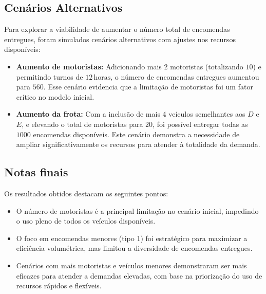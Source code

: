 \subsection{Cenários Alternativos}\label{subsec:cenarios-alternativos}
Para explorar a viabilidade de aumentar o número total de encomendas entregues, foram simulados cenários alternativos com ajustes nos recursos disponíveis:
\begin{itemize}
    \item \textbf{Aumento de motoristas:} Adicionando mais 2 motoristas (totalizando \(10\)) e permitindo turnos de \(12 \, \mathrm{horas}\), o número de encomendas entregues aumentou para \(560\).
    Esse cenário evidencia que a limitação de motoristas foi um fator crítico no modelo inicial.
    \item \textbf{Aumento da frota:} Com a inclusão de mais 4 veículos semelhantes aos \(D\) e \(E\), e elevando o total de motoristas para \(20\), foi possível entregar todas as \(1000\) encomendas disponíveis.
    Este cenário demonstra a necessidade de ampliar significativamente os recursos para atender à totalidade da demanda.
\end{itemize}

\subsection{Notas finais}\label{subsec:conclusoes-dos-resultados}
Os resultados obtidos destacam os seguintes pontos:
\begin{itemize}
    \item O número de motoristas é a principal limitação no cenário inicial, impedindo o uso pleno de todos os veículos disponíveis.
    \item O foco em encomendas menores (tipo 1) foi estratégico para maximizar a eficiência volumétrica, mas limitou a diversidade de encomendas entregues.
    \item Cenários com mais motoristas e veículos menores demonstraram ser mais eficazes para atender a demandas elevadas, com base na priorização do uso de recursos rápidos e flexíveis.
\end{itemize}